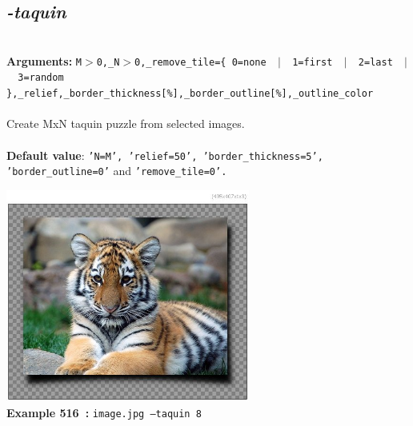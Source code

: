 \documentclass[a4paper,11pt,twoside]{book}
\begin{document}
\subsection{\emph{-taquin} }\vspace*{-0.5em}
~\\\textbf{Arguments: } 
{\small \texttt{M$>$0,\_N$>$0,\_remove\_tile=\{ 0=none ~$|$~ 1=first ~$|$~ 2=last ~$|$~ 3=random \},\_relief,\_border\_thickness[\%],\_border\_outline[\%],\_outline\_color}}\\~\\
Create MxN taquin puzzle from selected images.
~\\~\\\textbf{Default value}: {\small \texttt{'N=M', 'relief=50', 'border\_thickness=5', 'border\_outline=0'} and \texttt{'remove\_tile=0'.}}
\begin{center}\includegraphics[keepaspectratio=true,height=7cm,width=\textwidth]{img/gmic_def516.jpg}\\
{\footnotesize \textbf{Example 516~:} \texttt{image.jpg --taquin 8}}
\end{center}
\end{document}
